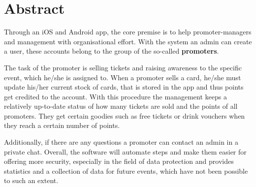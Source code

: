 \chapter{Abstract}
Through an iOS and Android app, the core premise is to help promoter-managers and management with organisational effort. 
With the system an admin can create a user, these accounts belong to the group of the so-called \textbf{promoters}.

The task of the promoter is selling tickets and raising awareness to the specific event, which he/she is assigned to. 
When a promoter sells a card, he/she must update his/her current stock of cards, that is stored in the app and thus points get credited to the account.
With this procedure the management keeps a relatively up-to-date status of how many tickets are sold and the points of all promoters.
They get certain goodies such as free tickets or drink vouchers when they reach a certain number of points.

Additionally, if there are any questions a promoter can contact an admin in a private chat.
Overall, the software will automate steps and make them easier for offering more security,
especially in the field of data protection and provides statistics and a collection of data for future events, which have not been possible to such an extent.
